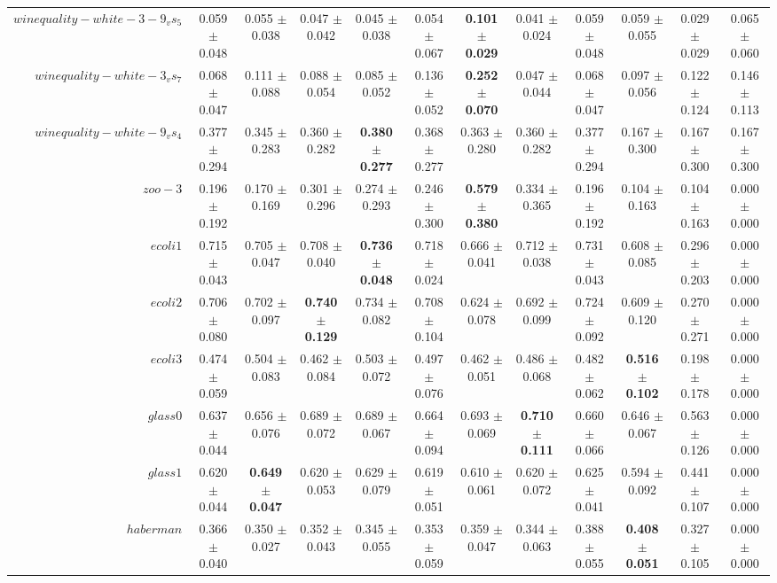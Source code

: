 \begin{table}[!ht]
{\begin{tabular}{r c c c c c c c c c c c}
$winequality-white-3-9_vs_5$ & 0.059 $\pm$ 0.048 & 0.055 $\pm$ 0.038 & 0.047 $\pm$ 0.042 & 0.045 $\pm$ 0.038 & 0.054 $\pm$ 0.067 & \textbf{0.101 $\pm$ 0.029} & 0.041 $\pm$ 0.024 & 0.059 $\pm$ 0.048 & 0.059 $\pm$ 0.055 & 0.029 $\pm$ 0.029 & 0.065 $\pm$ 0.060 \\
$winequality-white-3_vs_7$ & 0.068 $\pm$ 0.047 & 0.111 $\pm$ 0.088 & 0.088 $\pm$ 0.054 & 0.085 $\pm$ 0.052 & 0.136 $\pm$ 0.052 & \textbf{0.252 $\pm$ 0.070} & 0.047 $\pm$ 0.044 & 0.068 $\pm$ 0.047 & 0.097 $\pm$ 0.056 & 0.122 $\pm$ 0.124 & 0.146 $\pm$ 0.113 \\
$winequality-white-9_vs_4$ & 0.377 $\pm$ 0.294 & 0.345 $\pm$ 0.283 & 0.360 $\pm$ 0.282 & \textbf{0.380 $\pm$ 0.277} & 0.368 $\pm$ 0.277 & 0.363 $\pm$ 0.280 & 0.360 $\pm$ 0.282 & 0.377 $\pm$ 0.294 & 0.167 $\pm$ 0.300 & 0.167 $\pm$ 0.300 & 0.167 $\pm$ 0.300 \\
$zoo-3$ & 0.196 $\pm$ 0.192 & 0.170 $\pm$ 0.169 & 0.301 $\pm$ 0.296 & 0.274 $\pm$ 0.293 & 0.246 $\pm$ 0.300 & \textbf{0.579 $\pm$ 0.380} & 0.334 $\pm$ 0.365 & 0.196 $\pm$ 0.192 & 0.104 $\pm$ 0.163 & 0.104 $\pm$ 0.163 & 0.000 $\pm$ 0.000 \\
$ecoli1$ & 0.715 $\pm$ 0.043 & 0.705 $\pm$ 0.047 & 0.708 $\pm$ 0.040 & \textbf{0.736 $\pm$ 0.048} & 0.718 $\pm$ 0.024 & 0.666 $\pm$ 0.041 & 0.712 $\pm$ 0.038 & 0.731 $\pm$ 0.043 & 0.608 $\pm$ 0.085 & 0.296 $\pm$ 0.203 & 0.000 $\pm$ 0.000 \\
$ecoli2$ & 0.706 $\pm$ 0.080 & 0.702 $\pm$ 0.097 & \textbf{0.740 $\pm$ 0.129} & 0.734 $\pm$ 0.082 & 0.708 $\pm$ 0.104 & 0.624 $\pm$ 0.078 & 0.692 $\pm$ 0.099 & 0.724 $\pm$ 0.092 & 0.609 $\pm$ 0.120 & 0.270 $\pm$ 0.271 & 0.000 $\pm$ 0.000 \\
$ecoli3$ & 0.474 $\pm$ 0.059 & 0.504 $\pm$ 0.083 & 0.462 $\pm$ 0.084 & 0.503 $\pm$ 0.072 & 0.497 $\pm$ 0.076 & 0.462 $\pm$ 0.051 & 0.486 $\pm$ 0.068 & 0.482 $\pm$ 0.062 & \textbf{0.516 $\pm$ 0.102} & 0.198 $\pm$ 0.178 & 0.000 $\pm$ 0.000 \\
$glass0$ & 0.637 $\pm$ 0.044 & 0.656 $\pm$ 0.076 & 0.689 $\pm$ 0.072 & 0.689 $\pm$ 0.067 & 0.664 $\pm$ 0.094 & 0.693 $\pm$ 0.069 & \textbf{0.710 $\pm$ 0.111} & 0.660 $\pm$ 0.066 & 0.646 $\pm$ 0.067 & 0.563 $\pm$ 0.126 & 0.000 $\pm$ 0.000 \\
$glass1$ & 0.620 $\pm$ 0.044 & \textbf{0.649 $\pm$ 0.047} & 0.620 $\pm$ 0.053 & 0.629 $\pm$ 0.079 & 0.619 $\pm$ 0.051 & 0.610 $\pm$ 0.061 & 0.620 $\pm$ 0.072 & 0.625 $\pm$ 0.041 & 0.594 $\pm$ 0.092 & 0.441 $\pm$ 0.107 & 0.000 $\pm$ 0.000 \\
$haberman$ & 0.366 $\pm$ 0.040 & 0.350 $\pm$ 0.027 & 0.352 $\pm$ 0.043 & 0.345 $\pm$ 0.055 & 0.353 $\pm$ 0.059 & 0.359 $\pm$ 0.047 & 0.344 $\pm$ 0.063 & 0.388 $\pm$ 0.055 & \textbf{0.408 $\pm$ 0.051} & 0.327 $\pm$ 0.105 & 0.000 $\pm$ 0.000 \\

\end{tabular}}
\end{table}
